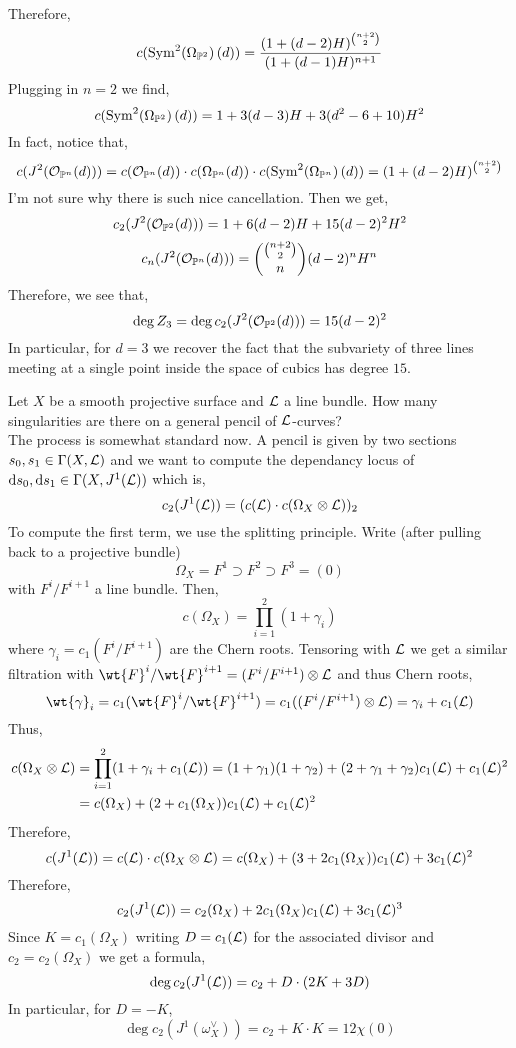 \documentclass[12pt]{article}
\begin{document}
\begin{example}
\begin{center}
\end{center}
Therefore,
\[ c(\mathrm{Sym}^{2}\! \left( \Omega_{\mathbb{P}^2} \right)(d)) = \frac{(1 + (d-2)H)^{{ n + 2 \choose  2}}}{(1 + (d - 1) H)^{n + 1}} \]
Plugging in $n = 2$ we find,
\[ c(\mathrm{Sym}^{2}\! \left( \Omega_{\mathbb{P}^2} \right)(d)) = 1 + 3(d - 3) H + 3 (d^2 - 6  + 10) H^2 \]
In fact, notice that,
\[ c(J^2(\mathcal{O}_{\mathbb{P}^n}(d))) = c(\mathcal{O}_{\mathbb{P}^n}(d)) \cdot c(\Omega_{\mathbb{P}^n}(d)) \cdot c(\mathrm{Sym}^{2}\! \left( \Omega_{\mathbb{P}^n} \right)(d)) = (1 + (d - 2) H)^{{ n + 2 \choose 2 }} \]
I'm not sure why there is such nice cancellation. Then we get,
\[ c_2(J^2(\mathcal{O}_{\mathbb{P}^2}(d))) = 1 + 6(d - 2) H + 15 (d - 2)^2 H^2 \]
\[ c_n(J^2(\mathcal{O}_{\mathbb{P}^n}(d))) = { {n + 2 \choose 2} \choose n} (d - 2)^n H^n \]
Therefore, we see that,
\[ \deg{Z_3} = \deg{c_2(J^2(\mathcal{O}_{\mathbb{P}^2}(d)))} = 15 (d - 2)^2 \]
In particular, for $d = 3$ we recover the fact that the subvariety of three lines meeting at a single point inside the space of cubics has degree $15$.
\end{example}

\begin{example}
Let $X$ be a smooth projective surface and $\mathcal{L}$ a line bundle. How many singularities are there on a general pencil of $\mathcal{L}$-curves?
\bigskip\\
The process is somewhat standard now. A pencil is given by two sections $s_0, s_1 \in \Gamma(X, \mathcal{L})$ and we want to compute the dependancy locus of $\mathrm{d}{s_0}, \mathrm{d}{s_1} \in \Gamma(X, J^1(\mathcal{L}))$ which is,
\[ c_2(J^1(\mathcal{L})) = (c(\mathcal{L}) \cdot c(\Omega_X \otimes \mathcal{L}))_2 \]
To compute the first term, we use the splitting principle. Write (after pulling back to a projective bundle)
\[ \Omega_X = F^1 \supset F^2 \supset F^3 = (0) \]
with $F^i/F^{i+1}$ a line bundle. Then,
\[ c(\Omega_X) = \prod_{i = 1}^2 (1 + \gamma_i) \]
where $\gamma_i = c_1(F^i/F^{i+1})$ are the Chern roots. Tensoring with $\mathcal{L}$ we get a similar filtration with $\wt{F}^i / \wt{F}^{i+1} = (F^i / F^{i+1}) \ot \L$ and thus Chern roots,
\[ \wt{\gamma}_i = c_1(\wt{F}^i / \wt{F}^{i+1}) = c_1((F^i / F^{i+1}) \ot \L) = \gamma_i + c_1(\L) \]
Thus,
\begin{align*}
c(\Omega_X \otimes \mathcal{L}) & = \prod_{i = 1}^2 (1 + \gamma_i + c_1(\mathcal{L})) = (1 + \gamma_1)(1 + \gamma_2) + (2 + \gamma_1 + \gamma_2) c_1(\mathcal{L}) + c_1(\mathcal{L})^2 
\\
& = c(\Omega_X) + (2 + c_1(\Omega_X)) c_1(\mathcal{L}) + c_1(\mathcal{L})^2
\end{align*}
Therefore,
\[ c(J^1(\mathcal{L})) = c(\mathcal{L}) \cdot c(\Omega_X \otimes \mathcal{L}) = c(\Omega_X) + (3 + 2 c_1(\Omega_X)) c_1(\mathcal{L}) + 3 c_1(\mathcal{L})^2 \]
Therefore,
\[ c_2(J^1(\mathcal{L})) = c_2(\Omega_X) + 2 c_1(\Omega_X) c_1(\mathcal{L}) + 3 c_1(\mathcal{L})^3 \]
Since $K = c_1(\Omega_X)$ writing $D = c_1(\mathcal{L})$ for the associated divisor and $c_2 = c_2(\Omega_X)$ we get a formula,
\[ \deg{c_2(J^1(\mathcal{L}))} = c_2 + D \cdot (2 K + 3 D) \]
In particular, for $D = -K$,
\[ \deg{c_2(J^1(\omega_X^\vee))} = c_2 + K \cdot K = 12 \chi(0) \]
\end{example}
\end{document}
